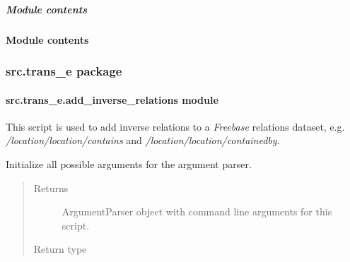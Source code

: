 \documentclass[letterpaper,10pt,english]{sphinxmanual}
\begin{document}
\subparagraph{Module contents}
\label{src.prep.relations:module-src.prep.relations}\label{src.prep.relations:module-contents}

\paragraph{Module contents}
\label{src.prep:module-contents}\label{src.prep:module-src.prep}

\subsubsection{src.trans\_e package}
\label{src.trans_e:src-trans-e-package}\label{src.trans_e::doc}

\paragraph{src.trans\_e.add\_inverse\_relations module}
\label{src.trans_e:module-src.trans_e.add_inverse_relations}\label{src.trans_e:src-trans-e-add-inverse-relations-module}
This script is used to add inverse relations to a \emph{Freebase} relations dataset, e.g.
\emph{/location/location/contains} and \emph{/location/location/containedby}.

\begin{fulllineitems}
\label{src.trans_e:src.trans_e.add_inverse_relations.add_inverse_relations}
\end{fulllineitems}


\begin{fulllineitems}
\label{src.trans_e:src.trans_e.add_inverse_relations.init_argparse}
Initialize all possible arguments for the argument parser.
\begin{quote}\begin{description}
\item[{Returns}] \leavevmode
ArgumentParser object with command line arguments for this script.

\item[{Return type}] \leavevmode
{}

\end{description}\end{quote}

\end{fulllineitems}
\end{document}
